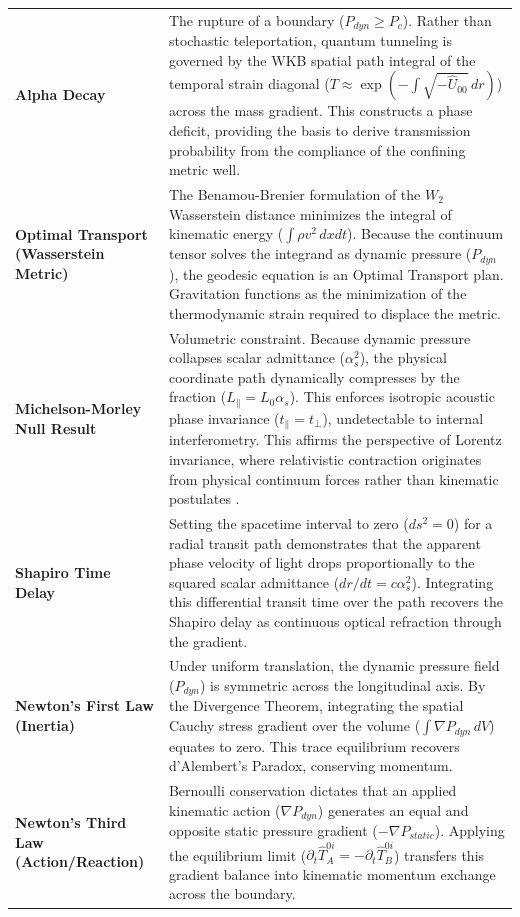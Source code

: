 \begin{longtable}{p{} p{}}
    \textbf{Alpha Decay} & The rupture of a boundary ($P_{dyn} \ge P_c$). Rather than stochastic teleportation, quantum tunneling is governed by the WKB spatial path integral of the temporal strain diagonal ($T \approx \exp(-\int \sqrt{-\hat{U}_{00}} \, dr)$) across the mass gradient. This constructs a phase deficit, providing the basis to derive transmission probability from the compliance of the confining metric well. \\ 
    \textbf{Optimal Transport (Wasserstein Metric)} & The Benamou-Brenier formulation of the $W_2$ Wasserstein distance minimizes the integral of kinematic energy ($\int \rho v^2 \, dx dt$). Because the continuum tensor solves the integrand as dynamic pressure ($P_{dyn}$), the geodesic equation is an Optimal Transport plan. Gravitation functions as the minimization of the thermodynamic strain required to displace the metric. \\ 
    \textbf{Michelson-Morley Null Result} & Volumetric constraint. Because dynamic pressure collapses scalar admittance ($\alpha_s^2$), the physical coordinate path dynamically compresses by the fraction ($L_\parallel = L_0 \alpha_s$). This enforces isotropic acoustic phase invariance ($t_\parallel = t_\perp$), undetectable to internal interferometry. This affirms the perspective of Lorentz invariance, where relativistic contraction originates from physical continuum forces rather than kinematic postulates \cite{bell1976teach, brown2005physical, Volovik2003}. \\ 
    \textbf{Shapiro Time Delay} & Setting the spacetime interval to zero ($ds^2 = 0$) for a radial transit path demonstrates that the apparent phase velocity of light drops proportionally to the squared scalar admittance ($dr/dt = c \alpha_s^2$). Integrating this differential transit time over the path recovers the Shapiro delay as continuous optical refraction through the gradient. \\ 
    \textbf{Newton's First Law (Inertia)} & Under uniform translation, the dynamic pressure field ($P_{dyn}$) is symmetric across the longitudinal axis. By the Divergence Theorem, integrating the spatial Cauchy stress gradient over the volume ($\int \nabla P_{dyn} \, dV$) equates to zero. This trace equilibrium recovers d'Alembert's Paradox, conserving momentum. \\ 
    \textbf{Newton's Third Law (Action/Reaction)} & Bernoulli conservation dictates that an applied kinematic action ($\nabla P_{dyn}$) generates an equal and opposite static pressure gradient ($-\nabla P_{static}$). Applying the equilibrium limit ($\partial_t \hat{T}^{0i}_A = - \partial_t \hat{T}^{0i}_B$) transfers this gradient balance into kinematic momentum exchange across the boundary. \\ 

\end{longtable}

